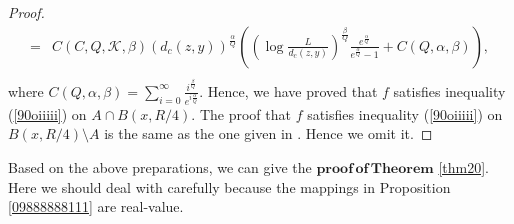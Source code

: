 \documentclass[11pt,twoside]{article}
\theoremstyle{definition}
\theoremstyle{remark}
\begin{document}
\begin{proof}
\begin{equation}
\begin{aligned}
=& C(C,Q,\mathcal{K},\beta)(d_{c}(z,y))^{\frac{\alpha}{Q}}\left(\left(\log\frac{L}{d_{c}(z,y)}\right)^{\frac{\beta}{Q}}\frac{e^{\frac{\alpha}{Q}}}{e^{\frac{\alpha}{Q}}-1}+C(Q,\alpha,\beta)\right),\\
\end{aligned}
\end{equation}
where $C(Q,\alpha,\beta)=\sum_{i=0}^{\infty}\frac{i^{\frac{\beta}{Q}}}{e^{i\frac{\alpha}{Q}}}.$
Hence, we have proved that  $f$ satisfies inequality (\ref{90oiiiii}) on $A\cap B(x,R/4).$ The proof  that $f$ satisfies inequality (\ref{90oiiiii}) on $ B(x,R/4)\setminus A$ is the same as the one given in \cite{DKO24}. Hence we omit it.
\end{proof}
Based on the above preparations, we can give the $\mathbf{proof\,of\,Theorem}$ \ref{thm20}. Here we should deal with carefully because the mappings in Proposition \ref{09888888111} are real-value.
\end{document}

